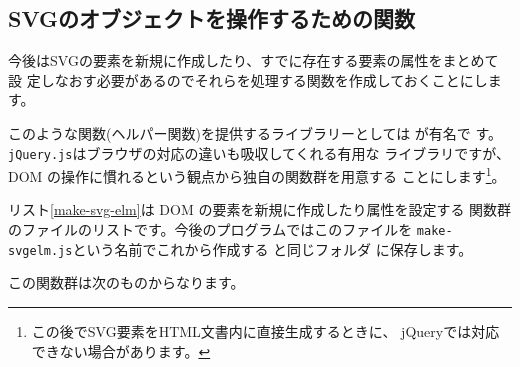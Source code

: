 \subsection{SVGのオブジェクトを操作するための関数}
\iffalse
錯視の図形は数学的に規則正しい図形が多くあります。
SVG文書の開始時の\Event{onload}の処理関数で要素を追加すれば
今まで、手でSVGの個々の要素を指定していた図形がより簡単に描けます。
\fi

今後はSVGの要素を新規に作成したり、すでに存在する要素の属性をまとめて設
定しなおす必要があるのでそれらを処理する関数を作成しておくことにします。

このような関数(ヘルパー関数)を提供するライブラリーとしては
が有名で
す。\texttt{jQuery.js}はブラウザの対応の違いも吸収してくれる有用な
ライブラリですが、DOM の操作に慣れるという観点から独自の関数群を用意する
ことにします\footnote{この後でSVG要素をHTML文書内に直接生成するときに、
jQueryでは対応できない場合があります。}。

リスト\ref{make-svg-elm}は DOM の要素を新規に作成したり属性を設定する
関数群のファイルのリストです。今後のプログラムではこのファイルを
\texttt{make-svgelm.js}という名前でこれから作成する \SVG と同じフォルダ
に保存します。

この関数群は次のものからなります。



